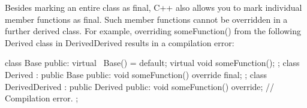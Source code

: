 
Besides marking an entire class as final, C++ also allows you to mark individual member functions as final. Such member functions cannot be overridden in a further derived class. For example, overriding someFunction() from the following Derived class in DerivedDerived results in a compilation error:

\begin{cpp}
class Base
{
    public:
        virtual ~Base() = default;
        virtual void someFunction();
};
class Derived : public Base
{
    public:
        void someFunction() override final;
};
class DerivedDerived : public Derived
{
    public:
        void someFunction() override; // Compilation error.
};
\end{cpp}






